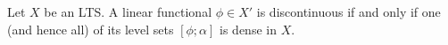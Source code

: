 Let $X$ be an LTS. A linear functional $\phi \in X'$ is discontinuous if and only if one (and hence all) of its level sets $[\phi; \alpha]$ is dense in $X$.